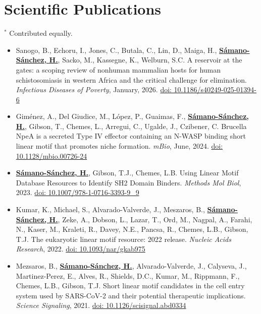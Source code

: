 \documentclass[11pt,a4paper,sans]{moderncv} %
\begin{document}
\vspace{0.2cm}

\section{Scientific Publications}
\vspace{-.1cm}
\footnotesize{$^{\ast}$ Contributed equally.} \hspace{.5cm}
\vspace{.1cm}
\begin{itemize}
  \item Sanogo, B., Echoru, I., Jones, C., Butala, C., Lin, D., Maiga, H., \textbf{\underline{S\'amano-S\'anchez, H.}}, Sacko, M., Kassegne, K., Welburn, S.C. A reservoir at the gates: a scoping review of nonhuman mammalian hosts for human schistosomiasis in western Africa and the critical challenge for elimination. \textit{Infectious Diseases of Poverty}, January, 2026. \href{https://doi.org/10.1186/s40249-025-01394-6}{doi: 10.1186/s40249-025-01394-6}
  \item Gim\'enez, A., Del Giudice, M., L\'opez, P., Guaimas, F., \textbf{\underline{S\'amano-S\'anchez, H.}}, Gibson, T., Chemes, L., Arregui, C., Ugalde, J., Czibener, C. Brucella NpeA is a secreted Type IV effector containing an N-WASP binding short linear motif that promotes niche formation. \textit{mBio}, June, 2024. \href{https://journals.asm.org/doi/10.1128/mbio.00726-24}{doi: 10.1128/mbio.00726-24}
  \item \textbf{\underline{S\'amano-S\'anchez, H.}}, Gibson, T.J., Chemes, L.B. Using Linear Motif Database Resources to Identify SH2 Domain Binders. \textit{Methods Mol Biol}, 2023. \href{https://doi.org/10.1007/978-1-0716-3393-9_9}{doi: 10.1007/978-1-0716-3393-9\_9}
  \item Kumar, K., Michael, S., Alvarado-Valverde, J., Meszaros, B., \textbf{\underline{S\'amano-S\'anchez, H.}}, Zeke, A., Dobson, L., Lazar, T., Ord, M., Nagpal, A., Farahi, N., Kaser, M., Kraleti, R., Davey, N.E., Pancsa, R., Chemes, L.B., Gibson, T.J. The eukaryotic linear motif resource: 2022 release. \textit{Nucleic Acids Research}, 2022. \href{https://doi.org/10.1093/nar/gkab975}{doi: 10.1093/nar/gkab975}
  \item Mezsaros, B., \textbf{\underline{S\'amano-S\'anchez, H.}}, Alvarado-Valverde, J., Calyseva, J., Martinez-Perez, E., Alves, R., Shields, D.C., Kumar, M., Rippmann, F., Chemes, L.B., Gibson, T.J. Short linear motif candidates in the cell entry system used by SARS-CoV-2 and their potential therapeutic implications. \textit{Science Signaling}, 2021. \href{https://doi.org/10.1126/scisignal.abd0334}{doi: 10.1126/scisignal.abd0334}

\end{itemize}
\end{document}
